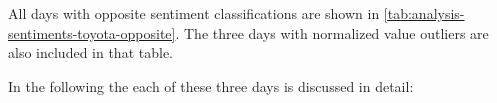 \begin{figure}[hbt]
    \centering
    
    \caption{\sentimentsCaption{\toyota}}
    \label{fig:analysis-sentiments-toyota}
\end{figure} 

All days with opposite sentiment classifications are shown in \cref{tab:analysis-sentiments-toyota-opposite}.
The three days with normalized value outliers are also included in that table.

In the following the each of these three days is discussed in detail:


